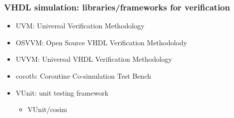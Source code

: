 \documentclass{beamer}
\begin{document}
\begin{frame}
\frametitle{VHDL simulation: libraries/frameworks for verification}
\begin{itemize}
\item UVM: Universal Verification Methodology \href{https://en.wikipedia.org/wiki/Universal_Verification_Methodology}{\faWikipediaW}
\vspace{.5em}

\item OSVVM: Open Source VHDL Verification Methodolody
\href{https://osvvm.org/}{\faGlobe}
\href{https://github.com/OSVVM/OSVVM}{\faGithub}
\vspace{.5em}

\item UVVM: Universal VHDL Verification Methodology \href{https://bitvis.no/dev-tools/uvvm/}{\faGlobe}
\href{https://github.com/UVVM}{\faGithub}
\vspace{2em}

\item cocotb: Coroutine Co-simulation Test Bench
\href{https://github.com/cocotb/cocotb}{\faGithub}
\href{https://cocotb.rtfd.io}{\faBook}
\href{http://potential.ventures/cocotb}{\faGlobe}
\href{https://pypi.org/project/cocotb/}{\faCode}
\vspace{.5em}

\item VUnit: unit testing framework
\href{https://github.com/VUnit/vunit}{\faGithub}
\href{http://vunit.github.io/}{\faBook}
\href{https://pypi.org/project/vunit-hdl/}{\faCode}

\begin{itemize}
\item VUnit/cosim
\href{https://github.com/VUnit/cosim}{\faGithub}
\href{https://vunit.github.io/cosim/}{\faBook}
\end{itemize}
\end{itemize}
\end{frame}
\end{document}

